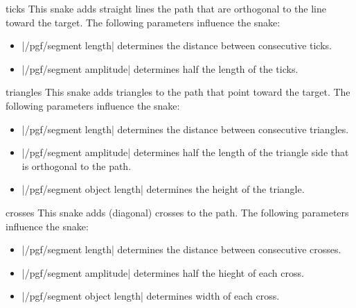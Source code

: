 \begin{decoration}{ticks}
  This snake adds straight lines  the path that are orthogonal to the
  line toward the target. The following parameters influence the snake: 
  \begin{itemize}
  \item |/pgf/segment length|
    determines the distance between consecutive ticks.
  \item |/pgf/segment amplitude|
    determines half the length of the ticks.
  \end{itemize}
\begin{codeexample}[]
\end{codeexample}
\end{decoration}

\begin{decoration}{triangles}
  This snake adds triangles to the path that point toward the
  target. The following parameters influence the snake: 
  \begin{itemize}
  \item |/pgf/segment length|
    determines the distance between consecutive triangles.
  \item |/pgf/segment amplitude|
    determines half the length of the triangle side that is orthogonal
    to the path.
  \item |/pgf/segment object length|
    determines the height of the triangle.
  \end{itemize}
\begin{codeexample}[]
\end{codeexample}
\end{decoration}

\begin{decoration}{crosses}
  This snake adds (diagonal) crosses to the path. The following
  parameters influence the snake:  
  \begin{itemize}
  \item |/pgf/segment length|
    determines the distance between consecutive crosses.
  \item |/pgf/segment amplitude|
    determines half the hieght of each cross.
  \item |/pgf/segment object length|
    determines width of each cross.
  \end{itemize}
\begin{codeexample}[]
\end{codeexample}
\end{decoration}



